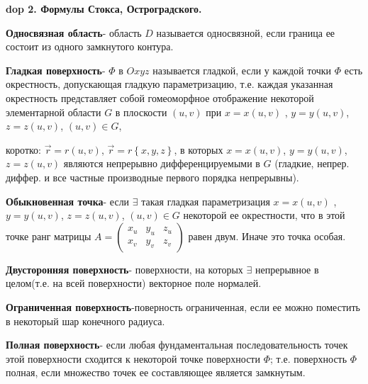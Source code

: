 \textbf{\LARGE dop 2. Формулы Стокса, Остроградского.}



\par \textbf{Односвязная область}- область $D$ называется односвязной, если
граница ее состоит из одного замкнутого контура.

\par \textbf{Гладкая поверхность}- $\Phi$ в $Oxyz$ называется гладкой, если у каждой точки $\Phi$ есть окрестность, допускающая гладкую параметризацию, т.е. каждая указанная окрестность представляет собой гомеоморфное отображение некоторой элементарной области $G$ в плоскости $\left( u,v\right)$ при
$x = x\left( u,v\right)$ , $y = y\left( u,v\right)$, $z = z\left( u,v\right)$, $\left( u,v\right) \in G$, 
\par коротко: $\overrightarrow{r}=r\left( u,v\right)$,  $\overrightarrow{r}=r\left\{ x,y,z\right\}$, в которых $x = x\left( u,v\right)$, $y = y\left( u,v\right)$, $z = z\left( u,v\right)$ являются непрерывно дифференцируемыми в $G$ (гладкие, непрер. диффер. и все частные производные первого порядка непрерывны).

\par \textbf{Обыкновенная точка}- если $\exists$ такая гладкая параметризация $x = x\left( u,v\right)$ , $y = y\left( u,v\right)$, $z = z\left( u,v\right)$, $\left( u,v\right) \in G$ некоторой ее окрестности, что в этой точке ранг матрицы $A=\begin{pmatrix} x_{u} & y_{u} & z_{u} \\ x_{v} & y_{v} & z_{v} \end{pmatrix}$ равен двум. Иначе это точка особая.

\par \textbf{Двусторонняя поверхность}- поверхности, на которых $\exists$ непрерывное в целом(т.е. на всей поверхности) векторное поле нормалей.

\par \textbf{Ограниченная поверхность}-поверность ограниченная, если ее можно поместить в некоторый шар конечного радиуса.

\par \textbf{Полная поверхность}- если любая фундаментальная последовательность точек этой поверхности сходится к некоторой точке поверхности $\Phi$; т.е. поверхность $\Phi$ полная, если множество точек ее составляющее является замкнутым.

